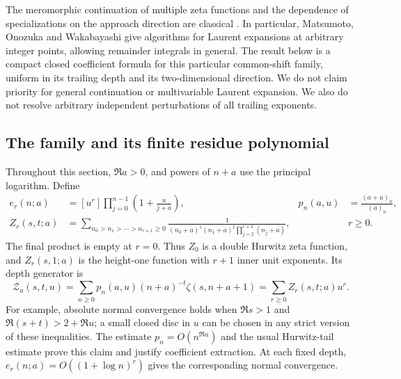 \documentclass[11pt,a4paper]{article}
\theoremstyle{definition}
\theoremstyle{remark}
\numberwithin{equation}{section}
\begin{document}
The meromorphic continuation of multiple zeta functions and the
dependence of specializations on the approach direction are classical
\cite{h2:AET,h2:MOW}. In particular, Matsumoto, Onozuka and Wakabayashi
give algorithms for Laurent expansions at arbitrary integer points,
allowing remainder integrals in general. The result below is a compact
closed coefficient formula for this particular common-shift family,
uniform in its trailing depth and its two-dimensional direction. We do
not claim priority for general continuation or multivariable Laurent
expansion. We also do not resolve arbitrary independent perturbations of
all trailing exponents.

\subsection{The family and its finite residue polynomial}

Throughout this section, $\Re a>0$, and powers of $n+a$ use the principal
logarithm. Define
\begin{align}
 e_r(n;a)&=[u^r]\prod_{j=0}^{n-1}\left(1+\frac{u}{j+a}\right),
 &p_n(a,u)&=\frac{(a+u)_n}{(a)_n},\label{h2:eq:e}\\
 Z_r(s,t;a)&=\sum_{n_0>n_1>\cdots>n_{r+1}\ge0}
 \frac{1}{(n_0+a)^s(n_1+a)^t\prod_{j=2}^{r+1}(n_j+a)},
 &&r\ge0.\label{h2:eq:Z}
\end{align}
The final product is empty at $r=0$. Thus $Z_0$ is a double Hurwitz
zeta function, and $Z_r(s,1;a)$ is the height-one function with $r+1$
inner unit exponents. Its depth generator is
\begin{equation}\label{h2:eq:generator}
 \mathcal Z_a(s,t,u)=\sum_{n\ge0}
     p_n(a,u)(n+a)^{-t}\zeta(s,n+a+1)
       =\sum_{r\ge0}Z_r(s,t;a)u^r.
\end{equation}
For example, absolute normal convergence holds when
$\Re s>1$ and $\Re(s+t)>2+\Re u$; a small closed disc in $u$
can be chosen in any strict version of these inequalities. The estimate
$p_n=O(n^{\Re u})$ and the usual Hurwitz-tail estimate prove this
claim and justify coefficient extraction. At each fixed depth,
$e_r(n;a)=O((1+\log n)^r)$ gives the corresponding normal convergence.
\end{document}
